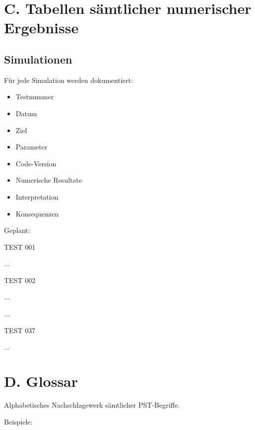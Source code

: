 \part{C. Tabellen sämtlicher numerischer Ergebnisse}

\chapter{Simulationen}

Für jede Simulation werden dokumentiert:

\begin{itemize}

\item
Testnummer

\item
Datum

\item
Ziel

\item
Parameter

\item
Code-Version

\item
Numerische Resultate

\item
Interpretation

\item
Konsequenzen

\end{itemize}

Geplant:

\begin{center}

TEST 001

...

TEST 002

...

...

TEST 037

...

\end{center}

\part{D. Glossar}

Alphabetisches Nachschlagewerk sämtlicher PST-Begriffe.

Beispiele:


